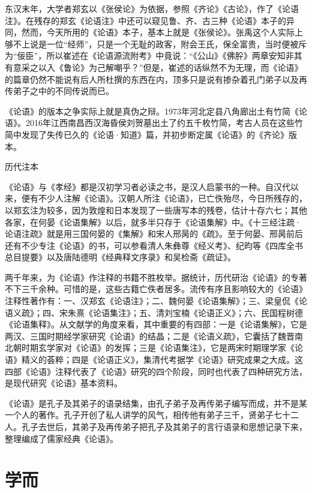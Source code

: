 \documentclass[a4paper,12pt,UTF8,twoside]{ctexbook}
\begin{document}
东汉末年，大学者郑玄以《张侯论》为依据，参照《齐论》《古论》，作了《论语注》。在残存的郑玄《论语注》中还可以窥见鲁、齐、古三种《论语》本子的异同，然而，今天所用的《论语》本子，基本上就是《张侯论》。张禹这个人实际上够不上说是一位“经师”，只是一个无耻的政客，附会王氏，保全富贵，当时便被斥为“佞臣”，所以崔述在《论语源流附考》中竟说：“《公山》《佛肸》两章安知非其有意采之以入《鲁论》为己解嘲乎？”但是，崔述的话纵然不为无理，而《论语》的篇章仍然不能说有后人所杜撰的东西在内，顶多只是说有掺杂着孔门弟子以及再传弟子之中的不同传说而已。

《论语》的版本之争实际上就是真伪之辩。1973年河北定县八角廊出土有竹简《论语》。2016年江西南昌西汉海昏侯刘贺墓出土了约五千枚竹简，考古人员在这些竹简中发现了失传已久的《论语·知道》篇，并初步断定属《论语》的《齐论》版本。

历代注本

《论语》与《孝经》都是汉初学习者必读之书，是汉人启蒙书的一种。自汉代以来，便有不少人注解《论语》。汉朝人所注《论语》，已亡佚殆尽，今日所残存的，以郑玄注为较多，因为敦煌和日本发现了一些唐写本的残卷，估计十存六七；其他各家，在何晏《论语集解》以后，就多半只存于《论语集解》中。《十三经注疏·论语注疏》就是用三国何晏的《集解》和宋人邢昺的《疏》。至于何晏、邢昺前后还有不少专注《论语》的书，可以参看清人朱彝尊《经义考》、纪昀等《四库全书总目提要》以及唐陆德明《经典释文序录》和吴检斋《疏证》。

两千年来，为《论语》作注释的书籍不胜枚举。据统计，历代研治《论语》的专著不下三千余种。可惜的是，这些古籍亡佚者居多。流传有序且影响较大的《论语》注释性著作有：一、汉郑玄《论语注》；二、魏何晏《论语集解》；三、梁皇侃《论语义疏》；四、宋朱熹《论语集注》；五、清刘宝楠《论语正义》；六、民国程树德《论语集释》。从文献学的角度来看，其中重要的有四部：一是《论语集解》，它是两汉、三国时期经学家研究《论语》的结晶；二是《论语义疏》，它囊括了魏晋南北朝时期玄学家对《论语》的发挥；三是《论语集注》，它是两宋时期理学家《论语》精义的荟粹；四是《论语正义》，集清代考据学《论语》研究成果之大成。这四部《论语》注释代表了《论语》研究的四个阶段，同时也代表了四种研究方法，是现代研究《论语》基本资料。

《论语》是孔子及其弟子的语录结集，由孔子弟子及再传弟子编写而成，并不是某一个人的著作。孔子开创了私人讲学的风气，相传他有弟子三千，贤弟子七十二人。孔子去世后，其弟子及再传弟子把孔子及其弟子的言行语录和思想记录下来，整理编成了儒家经典《论语》。


\mainmatter
\chapter{学而}
\end{document}
